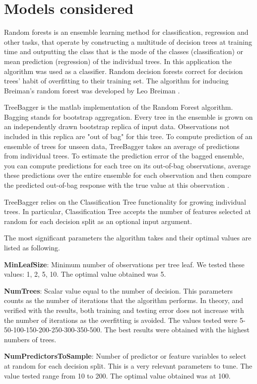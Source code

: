 \chapter{Models considered}
\label{ch:ch2label}
Random forests is an ensemble learning method for classification, regression and other tasks, that operate by constructing a multitude of decision trees at training time and outputting the class that is the mode of the classes (classification) or mean prediction (regression) of the individual trees. In this application the algorithm was used as a classifier. Random decision forests correct for decision trees' habit of overfitting to their training set. The algorithm for inducing Breiman's random forest was developed by Leo Breiman \citep{breiman2001random}.
 
TreeBagger is the matlab implementation of the Random Forest algorithm. 
Bagging stands for bootstrap aggregation. Every tree in the ensemble is grown on an independently drawn bootstrap replica of input data. Observations not included in this replica are "out of bag" for this tree. To compute prediction of an ensemble of trees for unseen data, TreeBagger takes an average of predictions from individual trees. To estimate the prediction error of the bagged ensemble, you can compute predictions for each tree on its out-of-bag observations, average these predictions over the entire ensemble for each observation and then compare the predicted out-of-bag response with the true value at this observation \citep{treebagger}.

TreeBagger relies on the Classification Tree functionality for growing individual trees. In particular, Classification Tree accepts the number of features selected at random for each decision split as an optional input argument.

The most significant parameters the algorithm takes and their optimal values are listed as following. 

\textbf{MinLeafSize}: Minimum number of observations per tree leaf. We tested these values: 1, 2, 5, 10. The optimal value obtained was 5.

\textbf{NumTrees}: Scalar value equal to the number of decision. This parameters counts as the number of iterations that the algorithm performs. In theory, and verified with the results, both training and testing error does not increase with the number of iterations as the overfitting is avoided. The values tested were 5-50-100-150-200-250-300-350-500. The best results were obtained with the highest numbers of trees.

\textbf{NumPredictorsToSample}: Number of predictor or feature variables to select at random for each decision split. This is a very relevant parameters to tune. The value tested range from 10 to 200. The optimal value obtained was at 100.
